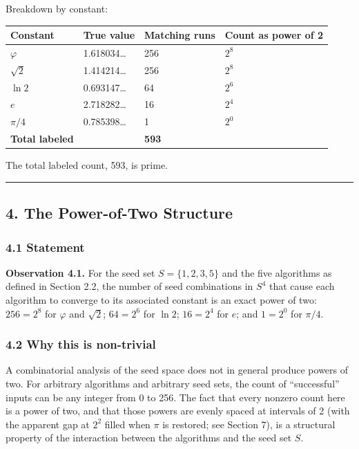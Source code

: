 \documentclass[
  11pt,
  letterpaper,
]{article}
\begin{document}
Breakdown by constant:

\begin{longtable}[]{@{}llll@{}}
\toprule\noalign{}
Constant & True value & Matching runs & Count as power of 2 \\
\midrule\noalign{}
\endhead
\bottomrule\noalign{}
\endlastfoot
\(\varphi\) & 1.618034\ldots{} & 256 & \(2^8\) \\
\(\sqrt{2}\) & 1.414214\ldots{} & 256 & \(2^8\) \\
\(\ln 2\) & 0.693147\ldots{} & 64 & \(2^6\) \\
\(e\) & 2.718282\ldots{} & 16 & \(2^4\) \\
\(\pi/4\) & 0.785398\ldots{} & 1 & \(2^0\) \\
\textbf{Total labeled} & & \textbf{593} & \\
\end{longtable}

The total labeled count, 593, is prime.

\begin{center}\rule{0.5\linewidth}{0.5pt}\end{center}

\subsection{4. The Power-of-Two
Structure}\label{the-power-of-two-structure}

\subsubsection{4.1 Statement}\label{statement}

\textbf{Observation 4.1.} For the seed set \(S = \{1, 2, 3, 5\}\) and
the five algorithms as defined in Section 2.2, the number of seed
combinations in \(S^4\) that cause each algorithm to converge to its
associated constant is an exact power of two: \(256 = 2^8\) for
\(\varphi\) and \(\sqrt{2}\); \(64 = 2^6\) for \(\ln 2\); \(16 = 2^4\)
for \(e\); and \(1 = 2^0\) for \(\pi/4\).

\subsubsection{4.2 Why this is
non-trivial}\label{why-this-is-non-trivial}

A combinatorial analysis of the seed space does not in general produce
powers of two. For arbitrary algorithms and arbitrary seed sets, the
count of ``successful'' inputs can be any integer from 0 to 256. The
fact that every nonzero count here is a power of two, and that those
powers are evenly spaced at intervals of 2 (with the apparent gap at
\(2^2\) filled when \(\pi\) is restored; see Section 7), is a structural
property of the interaction between the algorithms and the seed set
\(S\).
\end{document}
